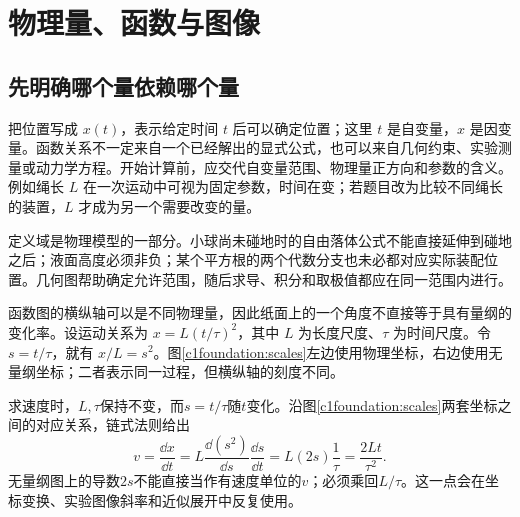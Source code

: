 \section{物理量、函数与图像}
\subsection{先明确哪个量依赖哪个量}
把位置写成 $x(t)$，表示给定时间 $t$ 后可以确定位置；这里 $t$ 是自变量，$x$ 是因变量。函数关系不一定来自一个已经解出的显式公式，也可以来自几何约束、实验测量或动力学方程。开始计算前，应交代自变量范围、物理量正方向和参数的含义。例如绳长 $L$ 在一次运动中可视为固定参数，时间在变；若题目改为比较不同绳长的装置，$L$ 才成为另一个需要改变的量。

定义域是物理模型的一部分。小球尚未碰地时的自由落体公式不能直接延伸到碰地之后；液面高度必须非负；某个平方根的两个代数分支也未必都对应实际装配位置。几何图帮助确定允许范围，随后求导、积分和取极值都应在同一范围内进行。

函数图的横纵轴可以是不同物理量，因此纸面上的一个角度不直接等于具有量纲的变化率。设运动关系为 $x=L(t/\tau)^2$，其中 $L$ 为长度尺度、$\tau$ 为时间尺度。令 $s=t/\tau$，就有 $x/L=s^2$。图\ref{c1foundation:scales}左边使用物理坐标，右边使用无量纲坐标；二者表示同一过程，但横纵轴的刻度不同。

求速度时，$L,\tau$保持不变，而$s=t/\tau$随$t$变化。沿图\ref{c1foundation:scales}两套坐标之间的对应关系，链式法则给出
\[
v=\frac{\dd x}{\dd t}
=L\frac{\dd(s^2)}{\dd s}\frac{\dd s}{\dd t}
=L(2s)\frac1\tau
=\frac{2Lt}{\tau^2}.
\]
无量纲图上的导数$2s$不能直接当作有速度单位的$v$；必须乘回$L/\tau$。这一点会在坐标变换、实验图像斜率和近似展开中反复使用。

